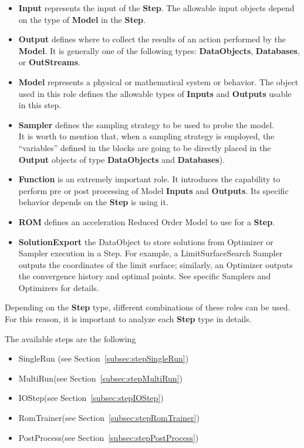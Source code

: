 \begin{itemize}
\item \textbf{Input} represents the input of the \textbf{Step}.
The allowable input objects depend on the type of \textbf{Model} in the
\textbf{Step}.
\item \textbf{Output} defines where to collect the results of an action
performed by the \textbf{Model}.
It is generally one of the following types: \textbf{DataObjects}, \textbf{Databases},
or \textbf{OutStreams}.
\item \textbf{Model} represents a physical or mathematical system or behavior.
The object used in this role defines the allowable types of
\textbf{Inputs} and \textbf{Outputs} usable in this step.
\item \textbf{Sampler} defines the sampling strategy to be used to probe the model.
\\ It is worth to mention that, when a sampling strategy is employed, the ``variables'' defined in the  blocks are going to be
directly placed in the \textbf{Output} objects of type \textbf{DataObjects} and \textbf{Databases}).
\item \textbf{Function} is an extremely important role. It introduces the capability to
perform pre or post processing of Model \textbf{Inputs} and \textbf{Outputs}. Its specific
behavior depends on the \textbf{Step} is using it.
\item \textbf{ROM} defines an acceleration Reduced Order Model to use for a
\textbf{Step}.
\item \textbf{SolutionExport} the DataObject to store solutions from Optimizer or Sampler execution
in a Step. For example, a LimitSurfaceSearch Sampler outputs the coordinates of the limit surface; 
similarly, an Optimizer outputs the convergence history and optimal points. 
See specific Samplers and Optimizers for details.
\end{itemize}
Depending on the \textbf{Step} type, different combinations of these roles can
be used.
For this reason, it is important to analyze each \textbf{Step} type in details.

The available steps are the following
\begin{itemize}
\item SingleRun (see Section~\ref{subsec:stepSingleRun})
\item MultiRun(see Section~\ref{subsec:stepMultiRun})
\item IOStep(see Section~\ref{subsec:stepIOStep})
\item RomTrainer(see Section~\ref{subsec:stepRomTrainer})
\item PostProcess(see Section~\ref{subsec:stepPostProcess})
\end{itemize}


